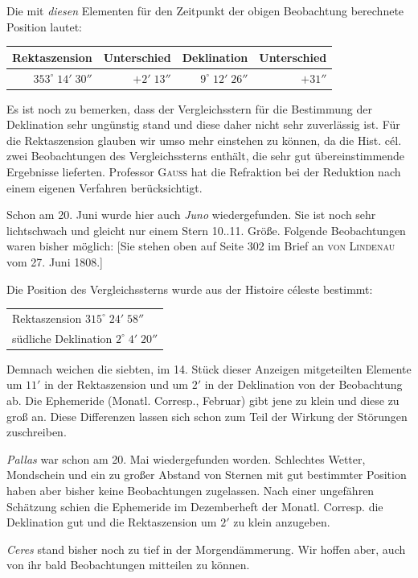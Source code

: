 \par\indent Die mit \emph{diesen} Elementen für den Zeitpunkt der obigen Beobachtung berechnete Position lautet:


\begin{center}\fontsize{10}{12}\selectfont\setlength{\tabcolsep}{3pt}\renewcommand{\arraystretch}{1.15}\begin{tabular}{rrrr}
Rektaszension & Unterschied & Deklination & Unterschied\\\hline
$353^\circ\;14'\;30''$ & $+2'\;13''$ & $9^\circ\;12'\;26''$ & $+31''$\\
\end{tabular}\end{center}


\par\indent Es ist noch zu bemerken, dass der Vergleichsstern für die Bestimmung der Deklination sehr ungünstig stand und diese daher nicht sehr zuverlässig ist. Für die Rektaszension glauben wir umso mehr einstehen zu können, da die Hist. cél. zwei Beobachtungen des Vergleichssterns enthält, die sehr gut übereinstimmende Ergebnisse lieferten. Professor \textsc{Gauss} hat die Refraktion bei der Reduktion nach einem eigenen Verfahren berücksichtigt.

\par\indent Schon am 20. Juni wurde hier auch \emph{Juno} wiedergefunden. Sie ist noch sehr lichtschwach und gleicht nur einem Stern 10..11. Größe. Folgende Beobachtungen waren bisher möglich: [Sie stehen oben auf Seite 302 im Brief an \textsc{von Lindenau} vom 27. Juni 1808.]

\par\indent Die Position des Vergleichssterns wurde aus der Histoire céleste bestimmt:


\begin{center}\fontsize{10}{12}\selectfont\setlength{\tabcolsep}{3pt}\renewcommand{\arraystretch}{1.15}\begin{tabular}{l}
Rektaszension $315^\circ\;24'\;58''$\\
südliche Deklination $2^\circ\;4'\;20''$
\end{tabular}\end{center}


\par\indent Demnach weichen die siebten, im 14. Stück dieser Anzeigen mitgeteilten Elemente um $11'$ in der Rektaszension und um $2'$ in der Deklination von der Beobachtung ab. Die Ephemeride (Monatl. Corresp., Februar) gibt jene zu klein und diese zu groß an. Diese Differenzen lassen sich schon zum Teil der Wirkung der Störungen zuschreiben.

\par\indent \emph{Pallas} war schon am 20. Mai wiedergefunden worden. Schlechtes Wetter, Mondschein und ein zu großer Abstand von Sternen mit gut bestimmter Position haben aber bisher keine Beobachtungen zugelassen. Nach einer ungefähren Schätzung schien die Ephemeride im Dezemberheft der Monatl. Corresp. die Deklination gut und die Rektaszension um $2'$ zu klein anzugeben.

\par\indent \emph{Ceres} stand bisher noch zu tief in der Morgendämmerung. Wir hoffen aber, auch von ihr bald Beobachtungen mitteilen zu können.
